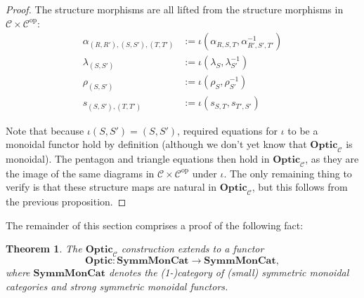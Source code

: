 \documentclass[11pt,letterpaper]{article}
\theoremstyle{plain}
\newtheorem{theorem}{Theorem}[subsection]
\theoremstyle{definition}
\newcommand{\C}{\mathscr{C}}
\newcommand{\lenslib}{\texttt{lens}}
\newcommand{\SymmMonCat}{\mathbf{SymmMonCat}}
\newcommand{\Optic}{\mathbf{Optic}}
\newcommand{\op}{\mathrm{op}}
\begin{document}
\begin{proof}
  The structure morphisms are all lifted from the structure morphisms in $\C \times \C^\op$:
  \begin{align*}
    \alpha_{(R, R'), (S, S'), (T, T')} &:= \iota(\alpha_{R,S,T}, \alpha_{R',S',T'}^{-1}) \\
    \lambda_{(S, S')} &:= \iota(\lambda_{S}, \lambda_{S'}^{-1}) \\
    \rho_{(S, S')} &:= \iota(\rho_{S}, \rho_{S'}^{-1}) \\
    s_{(S, S'), (T, T')} &:= \iota(s_{S, T}, s_{T', S'})
  \end{align*}

  Note that because $\iota(S, S') = (S, S')$, required equations for $\iota$ to be a monoidal functor hold by definition (although we don't yet know that $\Optic_\C$ is monoidal). The pentagon and triangle equations then hold in $\Optic_\C$, as they are the image of the same diagrams in $\C \times \C^\op$ under $\iota$. The only remaining thing to verify is that these structure maps are natural in $\Optic_\C$, but this follows from the previous proposition.
\end{proof}


The remainder of this section comprises a proof of the following fact:

\begin{theorem}\label{thm:optic-functor}
  The $\Optic_\C$ construction extends to a functor \[\Optic : \SymmMonCat \to \SymmMonCat,\] where $\SymmMonCat$ denotes the (1-)category of (small) symmetric monoidal categories and strong symmetric monoidal functors.
\end{theorem}
\end{document}
